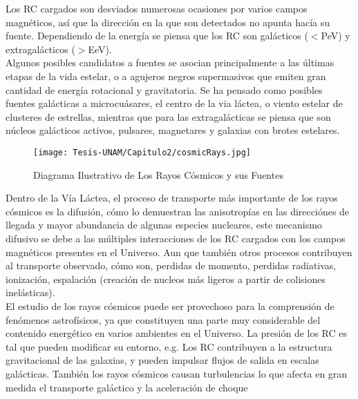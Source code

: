 Los RC cargados son desviados numerosas ocasiones por varios campos magnéticos, así que la dirección en la que son detectados no apunta hacía su fuente\cite{Workman:2022ynf}. Dependiendo de la energía se piensa que los RC son galácticos ($<$PeV) y extragalácticos ($>$EeV).\cite{Workman:2022ynf}\\

Algunos posibles candidatos a fuentes se asocian principalmente a las últimas etapas de la vida estelar, o a agujeros negros supermasivos que emiten gran cantidad de energía rotacional y gravitatoria\cite{Workman:2022ynf}. Se ha pensado como posibles fuentes galácticas a microcuásares, el centro de la via láctea, o viento estelar de clusteres de estrellas, mientras que para las extragalácticas se piensa que son núcleos galácticos activos, pulsares, magnetares y galaxias con brotes estelares\cite{Workman:2022ynf}.\\

\begin{figure}
    \centering
    \texttt{[image: Tesis-UNAM/Capitulo2/cosmicRays.jpg]}
    \caption{Diagrama Ilustrativo de Los Rayos Cósmicos y sus Fuentes}
    \label{fig:enter-label}
\end{figure}

Dentro de la Vía Láctea, el proceso de transporte más importante de los rayos cósmicos es la difusión\cite{Workman:2022ynf}, cómo lo demuestran las anisotropías en las direcciónes de llegada y mayor abundancia de algunas especies nucleares, este mecanismo difusivo se debe a las múltiples interacciones de los RC cargados con los campos magnéticos presentes en el Universo. Aun que también otros procesos contribuyen al transporte observado, cómo son, perdidas de momento, perdidas radiativas, ionización, espalación (creación de nucleos más ligeros a partir de colisiones inelásticas)\cite{Workman:2022ynf}. \\

El estudio de los rayos cósmicos puede ser provechoso para la comprensión de fenómenos astrofísicos, ya que constituyen una parte muy considerable del contenido energético en varios ambientes en el Universo. La presión de los RC es tal que pueden modificar su entorno, e.g. Los RC contribuyen a la estructura gravitacional de las galaxias, y pueden impulsar flujos de salida en escalas galácticas. También los rayos cósmicos causan turbulencias lo que afecta en gran medida el transporte galáctico y la aceleración de choque\\

